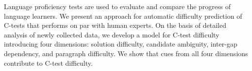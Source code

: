 Language proficiency tests are used to evaluate and compare the progress  of language learners. We present an approach for automatic difficulty prediction of C-tests that performs on par with human experts. On the basis of detailed analysis of newly collected data, we develop a model for C-test difficulty introducing four dimensions: solution difficulty, candidate ambiguity, inter-gap dependency, and paragraph difficulty. We show that cues from all four dimensions contribute to  C-test difficulty.